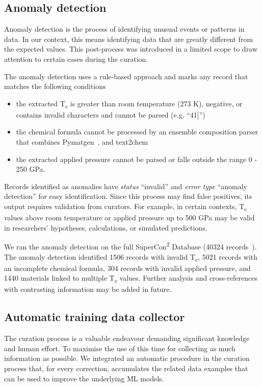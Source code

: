 \documentclass[]{interact}
\theoremstyle{plain} %
\theoremstyle{definition}
\theoremstyle{remark}
\begin{document}
\subsection{Anomaly detection}
\label{subsec:anomaly-detection}
Anomaly detection is the process of identifying unusual events or patterns in data. 
In our context, this means identifying data that are greatly different from the expected values.
This post-process was introduced in a limited scope to draw attention to certain cases during the curation.

The anomaly detection uses a rule-based approach and marks any record that matches the following conditions
\begin{itemize}
    \item the extracted T\textsubscript{c} is greater than room temperature (273 K), negative, or contains invalid characters and cannot be parsed (e.g. ``41]'')
    \item the chemical formula cannot be processed by an ensemble composition parser that combines Pymatgen~\cite{Ong2013}, and text2chem~\cite{kononova_text-mined_2019} 
    \item the extracted applied pressure cannot be parsed or falls outside the range 0 - 250 GPa.
\end{itemize}

Records identified as anomalies have \emph{status} ``invalid'' and \emph{error type} ``anomaly detection'' for easy identification.
Since this process may find false positives, its output requires validation from curators. 
For example, in certain contexts, T\textsubscript{c} values above room temperature or applied pressure up to 500 GPa may be valid in researchers' hypotheses, calculations, or simulated predictions. 

We ran the anomaly detection on the full SuperCon\textsuperscript{2} Database (40324 records~\cite{lfoppiano2023automatic}). 
The anomaly detection identified 1506 records with invalid T\textsubscript{c}, 5021 records with an incomplete chemical formula, 304 records with invalid applied pressure, and 1440 materials linked to multiple T\textsubscript{c} values. 
Further analysis and cross-references with contrasting information may be added in future. 

\subsection{Automatic training data collector}
\label{subsec:feedback-loop-training-data}
The curation process is a valuable endeavour demanding significant knowledge and human effort. 
To maximise the use of this time for collecting as much information as possible.
We integrated an automatic procedure in the curation process that, for every correction, accumulates the related data examples that can be used to improve the underlying ML models. 
\end{document}
